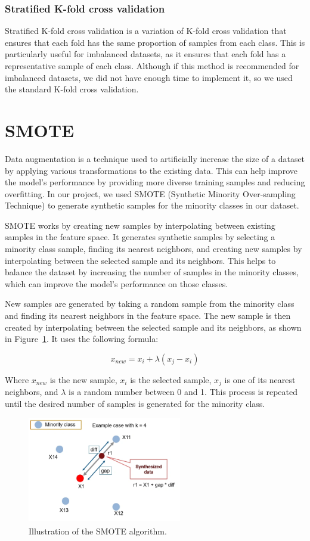 \subsubsection*{Stratified K-fold cross validation}
\label{subsec:stratified_k_fold_cross_validation}

Stratified K-fold cross validation is a variation of K-fold cross validation that ensures that each fold has the same proportion of samples
from each class. This is particularly useful for imbalanced datasets, as it ensures that each fold has a representative sample of each class.
Although if this method is recommended for imbalanced datasets, we did not have enough time to implement it, so we used the standard K-fold cross
validation.

\section{SMOTE}
\label{sec:smote}

Data augmentation is a technique used to artificially increase the size of a dataset by applying various transformations to the existing data.
This can help improve the model's performance by providing more diverse training samples and reducing overfitting. In our project, we used SMOTE
(Synthetic Minority Over-sampling Technique) to generate synthetic samples for the minority classes in our dataset.

SMOTE works by creating new samples by interpolating between existing samples in the feature space. It generates synthetic samples by selecting
a minority class sample, finding its nearest neighbors, and creating new samples by interpolating between the selected sample and its neighbors.
This helps to balance the dataset by increasing the number of samples in the minority classes, which can improve the model's performance on those
classes.

New samples are generated by taking a random sample from the minority class and finding its nearest neighbors in the feature space. The new sample
is then created by interpolating between the selected sample and its neighbors, as shown in Figure~\ref{fig:smote}. It uses the following formula:

\begin{equation}
	x_{new} = x_{i} + \lambda (x_{j} - x_{i})
\end{equation}

Where $x_{new}$ is the new sample, $x_{i}$ is the selected sample, $x_{j}$ is one of its nearest neighbors, and $\lambda$ is a random number
between 0 and 1. This process is repeated until the desired number of samples is generated for the minority class.

\begin{figure}[H]
	\centering
	\includegraphics[width=0.6\textwidth]{../imgs/smote.png}
	\caption{Illustration of the SMOTE algorithm.~\textsuperscript{\cite{analyticsvidhya-2020}}}
	\label{fig:smote}
\end{figure}